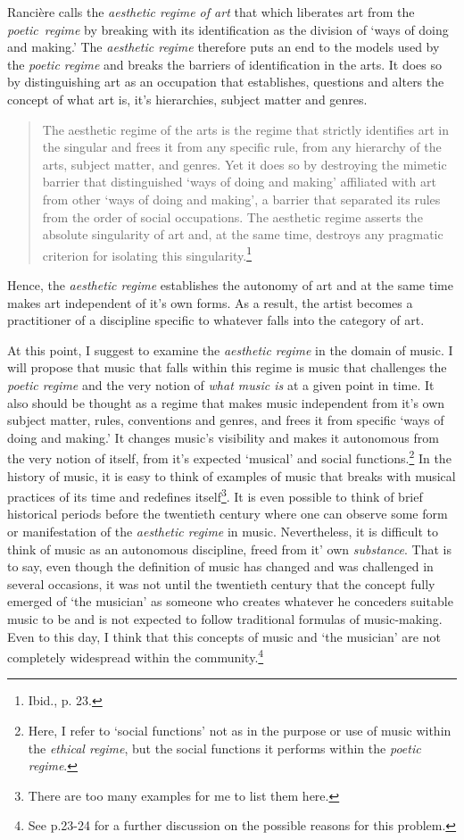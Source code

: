 Ranci\`{e}re calls the \emph{aesthetic regime of art} that which liberates art from the \mbox{\emph{poetic regime}} by breaking with its identification as the division of `ways of doing and making.' The \emph{aesthetic regime} therefore puts an end to the models used by the \emph{poetic regime} and breaks the barriers of identification in the arts. It does so by distinguishing art as an occupation that establishes, questions and alters the concept of what art is, it's hierarchies, subject matter and genres. 
\begin{quote}
The aesthetic regime of the arts is the regime that strictly identifies art in the singular and frees it from any specific rule, from any hierarchy of the arts, subject matter, and genres. Yet it does so by destroying the mimetic barrier that distinguished `ways of doing and making' affiliated with art from other `ways of doing and making', a barrier that separated its rules from the order of social occupations. The aesthetic regime asserts the absolute singularity of art and, at the same time, destroys any pragmatic criterion for isolating this singularity.\footnote{Ibid., p. 23.}
\end{quote}
Hence, the \emph{aesthetic regime} establishes the autonomy of art and at the same time makes art independent of it's own forms. As a result, the artist becomes a practitioner of a discipline specific to whatever falls into the category of art. 

At this point, I suggest to examine the \emph{aesthetic regime} in the domain of music. I will propose that music that falls within this regime is music that challenges the \emph{poetic regime} and the very notion of \emph{what music is} at a given point in time. It also should be thought as a regime that makes music independent from it's own subject matter, rules, conventions and genres, and frees it from specific `ways of doing and making.' It changes music's visibility and makes it autonomous from the very notion of itself, from it's expected `musical' and social functions.\footnote{Here, I refer to `social functions' not as in the purpose or use of music within the \emph{ethical regime}, but the social functions it performs within the \emph{poetic regime}.} In the history of music, it is easy to think of examples of music that breaks with musical practices of its time and redefines itself\footnote{There are too many examples for me to list them here.}. It is even possible to think of brief historical periods before the twentieth century where one can observe some form or manifestation of the \emph{aesthetic regime} in music. Nevertheless, it is difficult to think of music as an autonomous discipline, freed from it' own \emph{substance}. That is to say, even though the definition of music has changed and was challenged in several occasions, it was not until the twentieth century that the concept fully emerged of `the musician' as someone who creates whatever he conceders suitable music to be and is not expected to follow traditional formulas of music-making. Even to this day, I think that this concepts of music and `the musician' are not completely widespread within the community.\footnote{See p.23-24 for a further discussion on the possible reasons for this problem.}

